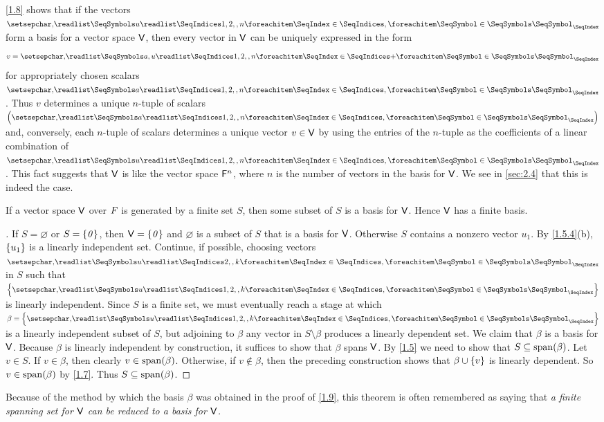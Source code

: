 \begin{note}
  \cref{1.8} shows that if the vectors \(\seq{u}{1,2,,n}\) form a basis for a vector space \(\mathsf{V}\), then every vector in \(\mathsf{V}\) can be uniquely expressed in the form
  \[
    v = \seq[+]{a,u}{1,2,,n}
  \]
  for appropriately chosen scalars \(\seq{a}{1,2,,n}\).
  Thus \(v\) determines a unique \(n\)-tuple of scalars \(\tuple{a}{1,2,,n}\) and, conversely, each \(n\)-tuple of scalars determines a unique vector \(v \in \mathsf{V}\) by using the entries of the \(n\)-tuple as the coefficients of a linear combination of \(\seq{u}{1,2,,n}\).
  This fact suggests that \(\mathsf{V}\) is like the vector space \(\mathsf{F}^n\), where \(n\) is the number of vectors in the basis for \(\mathsf{V}\).
  We see in \cref{sec:2.4} that this is indeed the case.
\end{note}

\begin{thm}\label{1.9}
  If a vector space \(\mathsf{V}\) over \(\mathit{F}\) is generated by a finite set \(S\), then some subset of \(S\) is a basis for \(\mathsf{V}\).
  Hence \(\mathsf{V}\) has a finite basis.
\end{thm}

\begin{proof}[]
  If \(S = \varnothing\) or \(S = \left\lbrace\mathit{0}\right\rbrace\), then \(\mathsf{V} = \left\lbrace\mathit{0}\right\rbrace\) and \(\varnothing\) is a subset of \(S\) that is a basis for \(\mathsf{V}\).
  Otherwise \(S\) contains a nonzero vector \(u_1\).
  By \cref{1.5.4}(b), \(\left\lbrace u_1\right\rbrace\) is a linearly independent set.
  Continue, if possible, choosing vectors \(\seq{u}{2,,k}\) in \(S\) such that \(\set{\seq{u}{1,2,,k}}\) is linearly independent.
  Since \(S\) is a finite set, we must eventually reach a stage at which \(\beta = \set{\seq{u}{1,2,,k}}\) is a linearly independent subset of \(S\), but adjoining to \(\beta\) any vector in \(S \setminus \beta\) produces a linearly dependent set.
  We claim that \(\beta\) is a basis for \(\mathsf{V}\).
  Because \(\beta\) is linearly independent by construction, it suffices to show that \(\beta\) spans \(\mathsf{V}\).
  By \cref{1.5} we need to show that \(S \subseteq \spn{\beta}\).
  Let \(v \in S\).
  If \(v \in \beta\), then clearly \(v \in \spn{\beta}\).
  Otherwise, if \(v \notin \beta\), then the preceding construction shows that \(\beta \cup \left\lbrace v\right\rbrace\) is linearly dependent.
  So \(v \in \spn{\beta}\) by \cref{1.7}.
  Thus \(S \subseteq \spn{\beta}\).
\end{proof}

\begin{note}
  Because of the method by which the basis \(\beta\) was obtained in the proof of \cref{1.9}, this theorem is often remembered as saying that \emph{a finite spanning set for \(\mathsf{V}\) can be reduced to a basis for \(\mathsf{V}\).}
\end{note}

